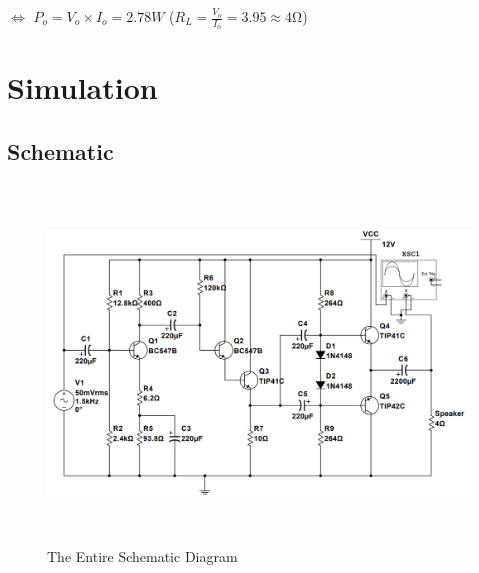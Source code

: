 \documentclass[twoside, a4paper, leqno]{article}
\begin{document}
		$\Leftrightarrow$ $P_o = V_o\times I_o = 2.78W$ ($R_L = \frac{V_o}{I_o} = 3.95 \approx 4 \si{\ohm}$)
		
		\vspace{0.5cm}
		\hspace{0.5cm}
				
	\newpage
	\section{Simulation}
		\subsection{Schematic}
			\begin{center}
				\begin{figure}[htp]
					\begin{center}
						\includegraphics[height=9.5cm]{figure/schematic.png}
					\end{center}
					\caption{The Entire Schematic Diagram}
					\label{refFigure9}
				\end{figure}
			\end{center}
\end{document}
